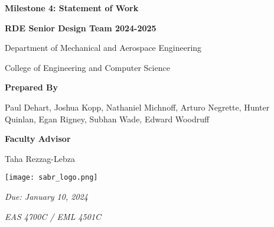 \begin{titlepage}

    \centering
    
    \begin{minipage}{6.5in}
        \centering
        \hspace{3em}
    \end{minipage}
    \vspace{1em}
    
    \textbf{\Large Milestone 4: Statement of Work}\par\vspace{4em}
    
    \textbf{RDE Senior Design Team 2024-2025}\par\vspace{0.5em}
    Department of Mechanical and Aerospace Engineering\par\vspace{0.5em}
    College of Engineering and Computer Science\par\vspace{3em}
    
    \textbf{Prepared By}\par\vspace{0.5em}
    Paul Dehart, Joshua Kopp, Nathaniel Michnoff, Arturo Negrette, Hunter Quinlan, Egan Rigney, Subhan Wade, Edward Woodruff\par\vspace{3em}
    
    {\bfseries Faculty Advisor}\par\vspace{0.5em}
    Taha Rezzag-Lebza\par\vspace{2em}
    
    \texttt{[image: sabr\_logo.png]}\par\vspace{2em}
    
    \textit{Due: January 10, 2024}\par\vspace{1em}
    \textit{EAS 4700C / EML 4501C}

\end{titlepage}

\newpage